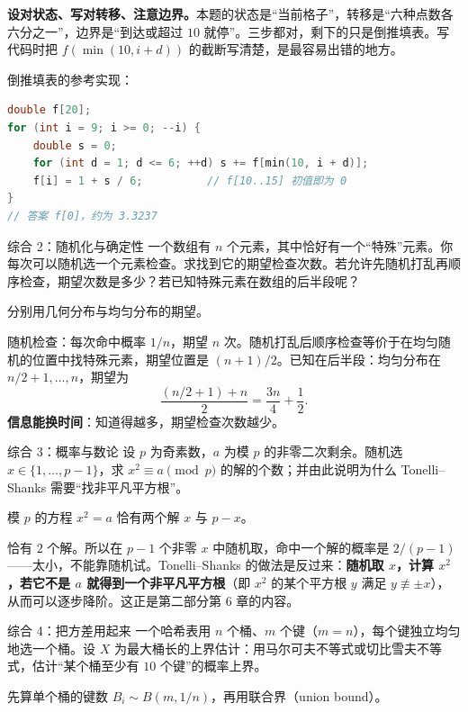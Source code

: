 \begin{teach}[期望 DP 的三步]
\textbf{设对状态、写对转移、注意边界。}本题的状态是“当前格子”，转移是“六种点数各六分之一”，边界是“到达或超过 $10$ 就停”。三步都对，剩下的只是倒推填表。写代码时把 $f(\min(10,i+d))$ 的截断写清楚，是最容易出错的地方。
\end{teach}

倒推填表的参考实现：
\begin{lstlisting}[language=C++]
double f[20];
for (int i = 9; i >= 0; --i) {
    double s = 0;
    for (int d = 1; d <= 6; ++d) s += f[min(10, i + d)];
    f[i] = 1 + s / 6;          // f[10..15] 初值即为 0
}
// 答案 f[0]，约为 3.3237
\end{lstlisting}

\begin{problem}{综合 2：随机化与确定性}
一个数组有 $n$ 个元素，其中恰好有一个“特殊”元素。你每次可以随机选一个元素检查。求找到它的期望检查次数。若允许先随机打乱再顺序检查，期望次数是多少？若已知特殊元素在数组的后半段呢？
\end{problem}
\hint 分别用几何分布与均匀分布的期望。

\sol 随机检查：每次命中概率 $1/n$，期望 $n$ 次。随机打乱后顺序检查等价于在均匀随机的位置中找特殊元素，期望位置是 $(n+1)/2$。已知在后半段：均匀分布在 $n/2+1,\ldots,n$，期望为
\[
\frac{(n/2+1)+n}{2}=\frac{3n}{4}+\frac12.
\]
\textbf{信息能换时间}：知道得越多，期望检查次数越少。

\begin{problem}{综合 3：概率与数论}
设 $p$ 为奇素数，$a$ 为模 $p$ 的非零二次剩余。随机选 $x\in\{1,\ldots,p-1\}$，求 $x^2\equiv a\pmod p$ 的解的个数；并由此说明为什么 Tonelli--Shanks 需要“找非平凡平方根”。
\end{problem}
\hint 模 $p$ 的方程 $x^2=a$ 恰有两个解 $x$ 与 $p-x$。

\sol 恰有 $2$ 个解。所以在 $p-1$ 个非零 $x$ 中随机取，命中一个解的概率是 $2/(p-1)$——太小，不能靠随机试。Tonelli--Shanks 的做法是反过来：\textbf{随机取 $x$，计算 $x^2$，若它不是 $a$ 就得到一个非平凡平方根}（即 $x^2$ 的某个平方根 $y$ 满足 $y\not\equiv\pm x$），从而可以逐步降阶。这正是第二部分第 6 章的内容。

\begin{problem}{综合 4：把方差用起来}
一个哈希表用 $n$ 个桶、$m$ 个键（$m=n$），每个键独立均匀地选一个桶。设 $X$ 为最大桶长的上界估计：用马尔可夫不等式或切比雪夫不等式，估计“某个桶至少有 $10$ 个键”的概率上界。
\end{problem}
\hint 先算单个桶的键数 $B_i\sim B(m,1/n)$，再用联合界（union bound）。


